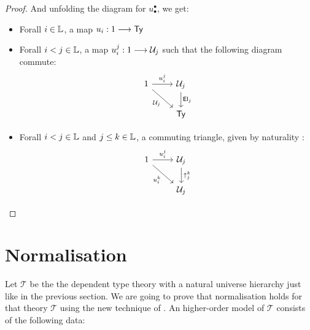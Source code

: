 \documentclass{article}
\begin{document}
\begin{proof}
    And unfolding the diagram for $u_\bullet^\bullet$, we get:
    \begin{itemize}
        \item Forall $i \in \mathbb{L}$, a map $u_i : 1 \longrightarrow \textsf{Ty}$
        \item Forall $i < j \in \mathbb{L}$, a map $u_i^j : 1 \longrightarrow \mathcal{U}_j$ such that the following diagram commute:
            \[\begin{tikzcd}
                1 & {\mathcal{U}_j} \\
                & {\mathsf{Ty}}
                \arrow["{u_i^j}", from=1-1, to=1-2]
                \arrow["{\cU_j}"', from=1-1, to=2-2]
                \arrow["{\mathsf{El}_j}", from=1-2, to=2-2]
            \end{tikzcd}\]
        \item Forall $i < j \in \mathbb{L}$ and $j \leq k \in \mathbb{L}$, a commuting triangle, given by naturality : 
            \[\begin{tikzcd}
                1 & {\mathcal{U}_j} \\
                & {\mathcal{U}_j}
                \arrow["{u_i^j}", from=1-1, to=1-2]
                \arrow["{u_i^k}"', from=1-1, to=2-2]
                \arrow["{\uparrow_j^k}", from=1-2, to=2-2]
            \end{tikzcd}\]
    \end{itemize}
    
\end{proof}

\section{Normalisation}

Let $\mathcal{T}$ be the the dependent type theory with a natural universe hierarchy just like
in the previous section.  We are going to prove that normalisation holds for that theory $\mathcal{T}$ using the new technique of \cite{sconing}.
An higher-order model of $\mathcal{T}$ consists of the following data: 
\end{document}
